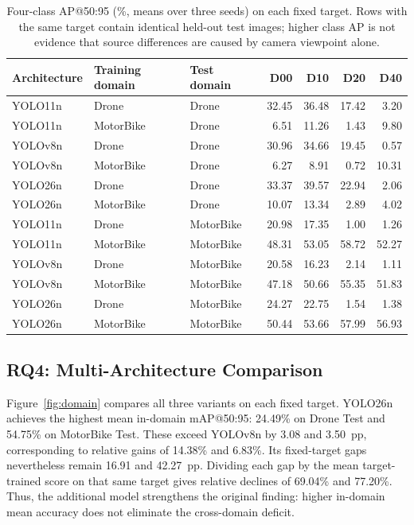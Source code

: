 \documentclass[conference,a4paper]{IEEEtran}
\begin{document}
\begin{table}[t]
\centering
\caption{Four-class AP@50:95 (\%, means over three seeds) on each fixed target. Rows with the same target contain identical held-out test images; higher class AP is not evidence that source differences are caused by camera viewpoint alone.}\label{tab:classap}
\begin{tabular}{lllrrrr}\toprule
Architecture & Training domain & Test domain & D00 & D10 & D20 & D40\\\midrule
YOLO11n & Drone & Drone & 32.45 & 36.48 & 17.42 & 3.20 \\
YOLO11n & MotorBike & Drone & 6.51 & 11.26 & 1.43 & 9.80 \\
YOLOv8n & Drone & Drone & 30.96 & 34.66 & 19.45 & 0.57 \\
YOLOv8n & MotorBike & Drone & 6.27 & 8.91 & 0.72 & 10.31 \\
YOLO26n & Drone & Drone & 33.37 & 39.57 & 22.94 & 2.06 \\
YOLO26n & MotorBike & Drone & 10.07 & 13.34 & 2.89 & 4.02 \\
YOLO11n & Drone & MotorBike & 20.98 & 17.35 & 1.00 & 1.26 \\
YOLO11n & MotorBike & MotorBike & 48.31 & 53.05 & 58.72 & 52.27 \\
YOLOv8n & Drone & MotorBike & 20.58 & 16.23 & 2.14 & 1.11 \\
YOLOv8n & MotorBike & MotorBike & 47.18 & 50.66 & 55.35 & 51.83 \\
YOLO26n & Drone & MotorBike & 24.27 & 22.75 & 1.54 & 1.38 \\
YOLO26n & MotorBike & MotorBike & 50.44 & 53.66 & 57.99 & 56.93 \\
\bottomrule
\end{tabular}
\end{table}

\subsection{RQ4: Multi-Architecture Comparison}
Figure~\ref{fig:domain} compares all three variants on each fixed target. YOLO26n achieves the highest mean in-domain mAP@50:95: 24.49\% on Drone Test and 54.75\% on MotorBike Test. These exceed YOLOv8n by 3.08 and 3.50~pp, corresponding to relative gains of 14.38\% and 6.83\%. Its fixed-target gaps nevertheless remain 16.91 and 42.27~pp. Dividing each gap by the mean target-trained score on that same target gives relative declines of 69.04\% and 77.20\%. Thus, the additional model strengthens the original finding: higher in-domain mean accuracy does not eliminate the cross-domain deficit.
\end{document}
